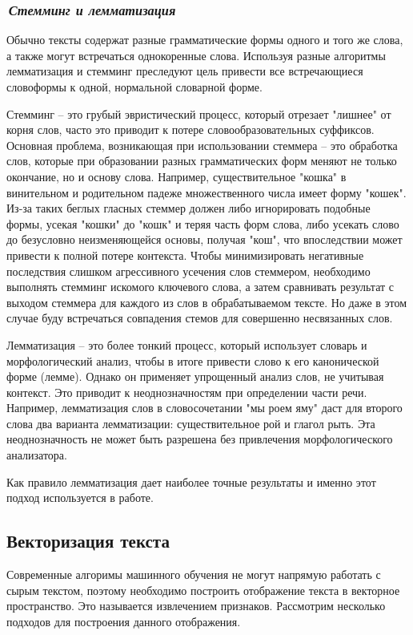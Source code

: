 \documentclass[12pt]{article}
\begin{document}
\subsubsection*{\it\,Стемминг и лемматизация}
Обычно тексты содержат разные грамматические формы одного и того же слова, а также могут встречаться однокоренные слова. Используя разные алгоритмы лемматизация и стемминг преследуют цель привести все встречающиеся словоформы к одной, нормальной словарной форме.


Стемминг -- это грубый эвристический процесс, который отрезает "лишнее" от корня слов, часто это приводит к потере словообразовательных суффиксов. Основная проблема, возникающая при использовании стеммера -- это обработка слов, которые при образовании разных грамматических форм меняют не только окончание, но и основу слова. Например, существительное "кошка" в винительном и родительном падеже множественного числа имеет форму "кошек". Из-за таких беглых гласных стеммер должен либо игнорировать подобные формы, усекая "кошки" до "кошк" и теряя часть форм слова, либо усекать слово до безусловно неизменяющейся основы, получая "кош", что впоследствии может привести к полной потере контекста. Чтобы минимизировать негативные последствия слишком агрессивного усечения слов стеммером, необходимо выполнять стемминг искомого ключевого слова, а затем сравнивать результат с выходом стеммера для каждого из слов в обрабатываемом тексте. Но даже в этом случае буду встречаться совпадения стемов для совершенно несвязанных слов.


Лемматизация -- это более тонкий процесс, который использует словарь и морфологический анализ, чтобы в итоге привести слово к его канонической форме (лемме). Однако он применяет упрощенный анализ слов, не учитывая контекст. Это приводит к неоднозначностям при определении части речи. Например, лемматизация слов в словосочетании "мы роем яму" даст для второго слова два варианта лемматизации: существительное рой и глагол рыть. Эта неоднозначность не может быть разрешена без привлечения морфологического анализатора.

Как правило лемматизация дает наиболее точные результаты и именно этот подход используется в работе.

\subsection*{Векторизация текста}
Современные алгоримы машинного обучения не могут напрямую работать с сырым текстом, поэтому необходимо построить отображение текста в векторное пространство. Это называется извлечением признаков. Рассмотрим несколько подходов для построения данного отображения.
\end{document}
